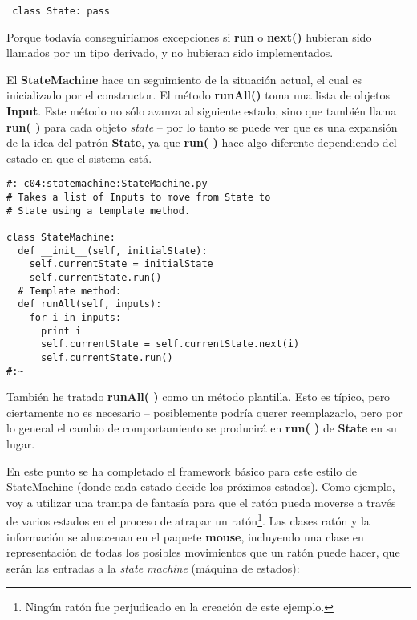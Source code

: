  \begin{lstlisting}
 class State: pass
 \end{lstlisting}
 
 Porque todavía conseguiríamos excepciones si \textbf{run} o \textbf{next()} hubieran sido llamados por un tipo derivado, y no hubieran sido implementados. \newline
 
El \textbf{StateMachine} hace un seguimiento de la situación actual, el cual es inicializado por el constructor. El método \textbf{runAll()} toma una lista de objetos \textbf{Input}. Este método no sólo avanza al siguiente estado, sino que también llama \textbf{run( )} para cada objeto \textit{state} – por lo tanto se puede ver que es una expansión de la idea del patrón \textbf{State}, ya que \textbf{run( )} hace algo diferente dependiendo del estado en que el sistema está.    \newline

\begin{lstlisting}
#: c04:statemachine:StateMachine.py 
# Takes a list of Inputs to move from State to  
# State using a template method. 

class StateMachine: 
  def __init__(self, initialState): 
    self.currentState = initialState 
    self.currentState.run() 
  # Template method: 
  def runAll(self, inputs): 
    for i in inputs: 
      print i 
      self.currentState = self.currentState.next(i) 
      self.currentState.run() 
#:~ 
\end{lstlisting}

También he tratado \textbf{runAll( )} como un método plantilla. Esto es típico, pero ciertamente no es necesario – posiblemente podría querer
reemplazarlo, pero por lo general el cambio de comportamiento se producirá en \textbf{run( )} de \textbf{State} en su lugar.       \newline

En este punto se ha completado el framework básico para este estilo de StateMachine (donde cada estado decide los próximos estados). Como ejemplo, voy a utilizar una trampa de fantasía para que el ratón pueda moverse a través de varios estados en el proceso de atrapar un ratón\footnote{Ningún ratón fue perjudicado en la creación de este ejemplo.}. Las clases ratón y la información se almacenan en el paquete \textbf{mouse}, incluyendo una clase en representación de todas los posibles movimientos que un ratón puede hacer, que serán las entradas a la \textit{state machine} (máquina de estados):       \newline

